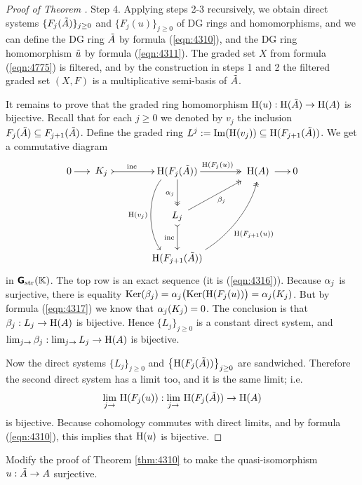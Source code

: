 \begin{proof}[Proof of Theorem \tup{\ref{thm:4310}}]
\medskip \noindent
Step 4. Applying steps 2-3 recursively, we obtain direct systems 
$\{ F_j(\tilde{A}) \}_{j \geq 0}$ and $\{ F_j(u) \}_{j \geq 0}$
of DG rings  and homomorphisms, and we can define the 
DG ring $\tilde{A}$ by formula (\ref{eqn:4310}), and the DG ring homomorphism 
$\tilde{u}$ by formula (\ref{eqn:4311}). 
The graded set $X$ from formula (\ref{eqn:4775}) is filtered, and by the 
construction in steps 1 and 2 the filtered graded set $(X, F)$ is a 
multiplicative semi-basis of $\tilde{A}$. 

It remains to prove that the graded ring homomorphism
$\operatorname{H}(u) :  \operatorname{H}(\tilde{A}) \to \operatorname{H}(A)$
is bijective. 
Recall that for each $j \geq0$ we denoted by $v_j$ the inclusion
$F_{j}(\tilde{A}) \subseteq F_{j + 1}(\tilde{A})$. 
Define the graded ring
$L^j := \operatorname{Im} (\operatorname{H}(v_j)) \subseteq \operatorname{H}(F_{j + 1}(\tilde{A}))$. 
We get a commutative diagram 
\[ \UseTips \xymatrix @C=3.5ex @R=5.5ex {
0 
\ar[r]
&
*++{K_j}
\ar@{>->}[rr]^(0.4){\mrm{inc}}
&
&
\opn{H}(F_{j}(\til{A}))
\ar@{->>}[rr]^{\opn{H}(F_{j}(u))}
\ar@{->>}[d]_{\al_j}
\ar@(l,l)[dd]_{\opn{H}(v_j)}
&
&
*++{\opn{H}(A)}
\ar[r]
&
0
\\
&
&
&
*++{L_j}  
\ar@{>->}[d]_{\mrm{inc}}
\ar@{->>}[urr]_{\be_j}
\\
&
&
&
\opn{H}(F_{j + 1}(\til{A}))
\ar@{->>}@(r,d)[uurr]_{\opn{H}(F_{j + 1}(u))}
} \]
in $\boldsymbol{\mathsf{G}}_{\mathrm{str}}(\mathbb{K})$. The top row is an exact sequence (it is 
(\ref{eqn:4316})). 
Because $\alpha_j$ is surjective, there is equality 
$\operatorname{Ker}(\beta_j) = \alpha_j \bigl( \operatorname{Ker}(\operatorname{H}(F_{j}(u)) \bigr) 
= \alpha_j(K_j)$.
But by formula (\ref{eqn:4317}) we know that 
$\alpha_j(K_j) = 0$. The conclusion is that 
$\beta_j : L_j \to \operatorname{H}(A)$ is bijective. 
Hence $\{ L_j \}_{j \geq 0}$ is a constant direct system, and 
$\lim_{j \to} \beta_j : \lim_{j \to} L_j \to \operatorname{H}(A)$
is bijective.
 
Now the direct systems 
$\{ L_j \}_{j \geq 0}$ and 
$\bigl\{ \operatorname{H}(F_{j}(\tilde{A})) \bigr\}_{j \geq 0}$
are sandwiched. Therefore the second direct system has a limit too, and it is 
the same limit; i.e.\ 
\[ \lim_{j \to} \, \operatorname{H}(F_{j}(u)) : 
\lim_{j \to} \, \operatorname{H}(F_{j}(\tilde{A})) \to \operatorname{H}(A) \]
is bijective. Because cohomology commutes with direct limits, 
and by formula (\ref{eqn:4310}), this implies that $\operatorname{H}(u)$
is bijective.
\end{proof}

\begin{exer} \label{exer:4315}
Modify the proof of Theorem \ref{thm:4310} to make the quasi-iso\-morphism 
$u : \tilde{A} \to A$ surjective. 
\end{exer}

